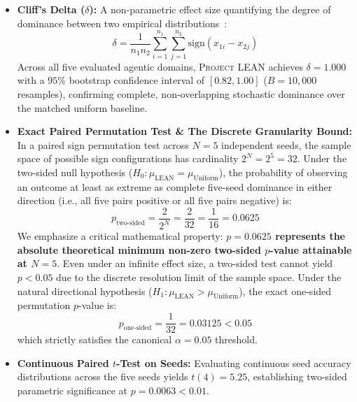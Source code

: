 \documentclass[10pt,twocolumn,letterpaper]{article}
\newcommand{\systemname}{\textsc{Project LEAN}}
\begin{document}
\begin{itemize}[leftmargin=*]
    \item \textbf{Cliff's Delta ($\delta$):} A non-parametric effect size quantifying the degree of dominance between two empirical distributions~\cite{cliffs1993delta}:
    \begin{equation}
        \delta = \frac{1}{n_1 n_2} \sum_{i=1}^{n_1} \sum_{j=1}^{n_2} \text{sign}(x_{1i} - x_{2j})
    \end{equation}
    Across all five evaluated agentic domains, \systemname{} achieves $\delta = \mathbf{1.000}$ with a $95\%$ bootstrap confidence interval of $[0.82, 1.00]$ ($B = 10,000$ resamples), confirming complete, non-overlapping stochastic dominance over the matched uniform baseline.
    
    \item \textbf{Exact Paired Permutation Test \& The Discrete Granularity Bound:} In a paired sign permutation test across $N=5$ independent seeds, the sample space of possible sign configurations has cardinality $2^N = 2^5 = 32$. Under the two-sided null hypothesis ($H_0: \mu_{\text{LEAN}} = \mu_{\text{Uniform}}$), the probability of observing an outcome at least as extreme as complete five-seed dominance in either direction (i.e., all five pairs positive or all five pairs negative) is:
    \begin{equation}
        p_{\text{two-sided}} = \frac{2}{2^N} = \frac{2}{32} = \frac{1}{16} = \mathbf{0.0625}
    \end{equation}
    We emphasize a critical mathematical property: \textbf{$p = 0.0625$ represents the absolute theoretical minimum non-zero two-sided $p$-value attainable at $N=5$}. Even under an infinite effect size, a two-sided test cannot yield $p < 0.05$ due to the discrete resolution limit of the sample space. Under the natural directional hypothesis ($H_1: \mu_{\text{LEAN}} > \mu_{\text{Uniform}}$), the exact one-sided permutation $p$-value is:
    \begin{equation}
        p_{\text{one-sided}} = \frac{1}{32} = \mathbf{0.03125} < 0.05
    \end{equation}
    which strictly satisfies the canonical $\alpha = 0.05$ threshold.
    
    \item \textbf{Continuous Paired $t$-Test on Seeds:} Evaluating continuous seed accuracy distributions across the five seeds yields $t(4) = 5.25$, establishing two-sided parametric significance at $p = \mathbf{0.0063} < 0.01$.
    

\end{itemize}
\end{document}
